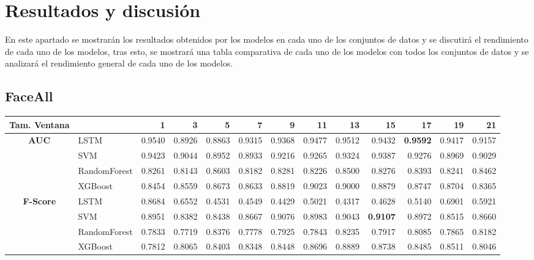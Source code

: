 \chapter{Resultados y discusión}
En este apartado se mostrarán los resultados obtenidos por los modelos en cada uno de los conjuntos de datos y se discutirá el rendimiento de cada uno de los modelos, tras esto, se mostrará una tabla comparativa de cada uno de los modelos con todos los conjuntos de datos y se analizará el rendimiento general de cada uno de los modelos.\newline

\section{FaceAll}
\begin{table}[h]
	\begin{adjustbox}{max width=15cm}
		\centering
		\begin{tabular}{|c|l|r|r|r|r|r|r|r|r|r|r|r|}
			\hline
			\textbf{Tam. Ventana}
			&         &      1  &      3  &      5  &      7  &      9  &      11 &      13 &      15 &      17 &      19 &      21 \\
			\hline
			\textbf{AUC} & LSTM &  0.9540 &  0.8926 &  0.8863 &  0.9315 &  0.9368 &  0.9477 &  0.9512 &  0.9432 &  \textbf{0.9592} &  0.9417 &  0.9157 \\
			& SVM &  0.9423 &  0.9044 &  0.8952 &  0.8933 &  0.9216 &  0.9265 &  0.9324 &  0.9387 &  0.9276 &  0.8969 &  0.9029 \\
			& RandomForest &  0.8261 &  0.8143 &  0.8603 &  0.8182 &  0.8281 &  0.8226 &  0.8500 &  0.8276 &  0.8393 &  0.8241 &  0.8462 \\
			& XGBoost &  0.8454 &  0.8559 &  0.8673 &  0.8633 &  0.8819 &  0.9023 &  0.9000 &  0.8879 &  0.8747 &  0.8704 &  0.8365 \\
			\hline
			\textbf{F-Score} & LSTM &  0.8684 &  0.6552 &  0.4531 &  0.4549 &  0.4429 &  0.5021 &  0.4317 &  0.4628 &  0.5140 &  0.6901 &  0.5921 \\
			& SVM &  0.8951 &  0.8382 &  0.8438 &  0.8667 &  0.9076 &  0.8983 &  0.9043 &  \textbf{0.9107} &  0.8972 &  0.8515 &  0.8660 \\
			& RandomForest &  0.7833 &  0.7719 &  0.8376 &  0.7778 &  0.7925 &  0.7843 &  0.8235 &  0.7917 &  0.8085 &  0.7865 &  0.8182 \\
			& XGBoost &  0.7812 &  0.8065 &  0.8403 &  0.8348 &  0.8448 &  0.8696 &  0.8889 &  0.8738 &  0.8485 &  0.8511 &  0.8046 \\

\end{tabular}
\end{adjustbox}
\end{table}
